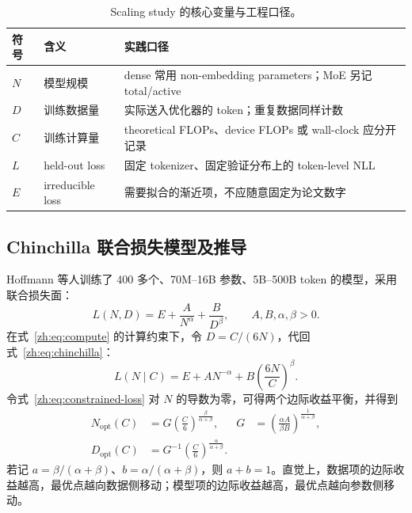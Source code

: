 \documentclass[UTF8,10pt,a4paper,fontset=none]{ctexart}
\begin{document}
\begin{table}[htbp]
\centering
\caption{Scaling study 的核心变量与工程口径。}
\label{zh:tab:symbols}
\begin{tabularx}{\textwidth}{C{1.0cm}YY}
\toprule
符号 & 含义 & 实践口径 \\
\midrule
$N$ & 模型规模 & dense 常用 non-embedding parameters；MoE 另记 total/active \\
$D$ & 训练数据量 & 实际送入优化器的 token；重复数据同样计数 \\
$C$ & 训练计算量 & theoretical FLOPs、device FLOPs 或 wall-clock 应分开记录 \\
$L$ & held-out loss & 固定 tokenizer、固定验证分布上的 token-level NLL \\
$E$ & irreducible loss & 需要拟合的渐近项，不应随意固定为论文数字 \\
\bottomrule
\end{tabularx}
\end{table}

\subsection{Chinchilla 联合损失模型及推导}

Hoffmann 等人训练了 400 多个、70M--16B 参数、5B--500B token 的模型，采用联合损失面\cite{zh:hoffmann2022}：
\begin{equation}
  L(N,D)=E+\frac{A}{N^{\alpha}}+\frac{B}{D^{\beta}},
  \qquad A,B,\alpha,\beta>0.
  \label{zh:eq:chinchilla}
\end{equation}
在式~\eqref{zh:eq:compute} 的计算约束下，令 $D=C/(6N)$，代回式~\eqref{zh:eq:chinchilla}：
\begin{equation}
  L(N\mid C)=E+A N^{-\alpha}
  +B\left(\frac{6N}{C}\right)^{\beta}.
  \label{zh:eq:constrained-loss}
\end{equation}
令式~\eqref{zh:eq:constrained-loss} 对 $N$ 的导数为零，可得两个边际收益平衡，并得到
\begin{align}
  N_{\mathrm{opt}}(C)
  &=G\left(\frac{C}{6}\right)^{\frac{\beta}{\alpha+\beta}},
  &G&=\left(\frac{\alpha A}{\beta B}\right)^{\frac{1}{\alpha+\beta}},
  \label{zh:eq:nopt}\\
  D_{\mathrm{opt}}(C)
  &=G^{-1}\left(\frac{C}{6}\right)^{\frac{\alpha}{\alpha+\beta}}.
  \label{zh:eq:dopt}
\end{align}
若记 $a=\beta/(\alpha+\beta)$、$b=\alpha/(\alpha+\beta)$，则 $a+b=1$。直觉上，数据项的边际收益越高，最优点越向数据侧移动；模型项的边际收益越高，最优点越向参数侧移动。
\end{document}
